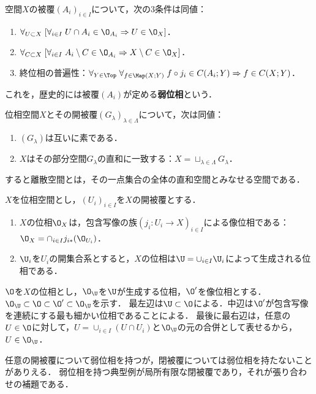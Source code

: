 \documentclass[uplatex,dvipdfmx]{jsreport}
\begin{document}
\begin{lemma}
    空間$X$の被覆$(A_i)_{i\in I}$について，次の3条件は同値：
    \begin{enumerate}
        \item $\forall_{U\subset X}\;[\forall_{i\in I}\;U\cap A_i\in\O_{A_i}\Rightarrow U\in\O_X]$．
        \item $\forall_{C\subset X}\;[\forall_{i\in I}\;A_i\setminus C\in\O_{A_i}\Rightarrow X\setminus C\in\O_X]$．
        \item 終位相の普遍性：$\forall_{Y\in\Top}\;\forall_{f\in \Map(X;Y)}\;f\circ j_i\in C(A_i;Y)\Rightarrow f\in C(X;Y)$．
    \end{enumerate}
    これを，歴史的には被覆$(A_i)$が定める\textbf{弱位相}という．
\end{lemma}

\begin{theorem}[直和空間の検出]
    位相空間$X$とその開被覆$(G_\lambda)_{\lambda\in\Lambda}$について，次は同値：
    \begin{enumerate}
        \item $(G_\lambda)$は互いに素である．
        \item $X$はその部分空間$G_\lambda$の直和に一致する：$X=\sqcup_{\lambda\in\Lambda}G_\lambda$．
    \end{enumerate}
\end{theorem}
\begin{remarks}
    すると離散空間とは，その一点集合の全体の直和空間とみなせる空間である．
\end{remarks}

\begin{proposition}[開被覆からその空間の位相について言えること]
    $X$を位相空間とし，$(U_i)_{i\in I}$を$X$の開被覆とする．
    \begin{enumerate}
        \item $X$の位相$\O_X$は，包含写像の族$(j_i:U_i\to X)_{i\in I}$による像位相である：$\O_X=\cap_{i\in I}j_{i*}(\O_{U_i})$．
        \item $\U_i$を$U_i$の開集合系とすると，$X$の位相は$\U=\cup_{i\in I}\U_i$によって生成される位相である．
    \end{enumerate}
\end{proposition}
\begin{Proof}
    $\O$を$X$の位相とし，$\O_\U$を$\U$が生成する位相，$\O'$を像位相とする．
    $\O_\U\subset\O\subset\O'\subset\O_\U$を示す．
    最左辺は$\U\subset\O$による．中辺は$\O'$が包含写像を連続にする最も細かい位相であることによる．
    最後に最右辺は，任意の$U\in\O$に対して，$U=\cup_{i\in I}(U\cap U_i)$と$\O_\U$の元の合併として表せるから，$U\in\O_\U$．
\end{Proof}
\begin{remarks}
    任意の開被覆について弱位相を持つが，閉被覆については弱位相を持たないことがありえる．
    弱位相を持つ典型例が局所有限な閉被覆であり，それが張り合わせの補題である．
\end{remarks}
\end{document}
